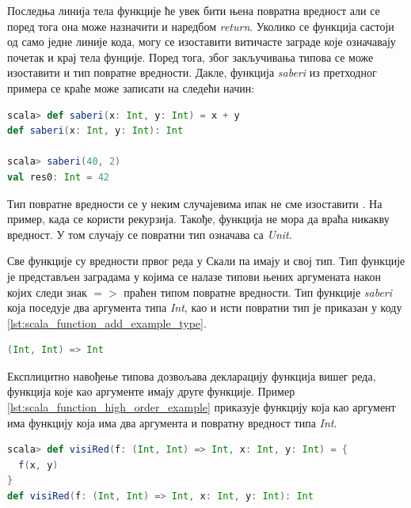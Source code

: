 \documentclass[12pt,oneside]{memoir}
\begin{document}
Последња линија тела функције ће увек бити њена повратна вредност али се поред тога она може назначити и наредбом \textit{return}. Уколико се функција састоји од само једне линије кода, могу се изоставити витичасте заграде које означавају почетак и крај тела фунције. Поред тога, због закључивања типова се може изоставити и тип повратне вредности. Дакле, функција \textit{saberi} из претходног примера се краће може записати на следећи начин:

\begin{lstlisting}[language=Scala, caption={Краћи запис функције \textit{saberi}}, label={lst:scala_function_add_example_simplified}, basicstyle=\small]
scala> def saberi(x: Int, y: Int) = x + y
def saberi(x: Int, y: Int): Int

scala> saberi(40, 2)
val res0: Int = 42
\end{lstlisting}

Тип повратне вредности се у неким случајевима ипак не сме изоставити \cite{scala_prog}. На пример, када се користи рекурзија. Такође, функција не мора да враћа никакву вредност. У том случају се повратни тип означава са \textit{Unit}.

Све функције су вредности првог реда у Скали па имају и свој тип. Тип функције је представљен заградама у којима се налазе типови њених аргумената након којих следи знак $=>$ праћен типом повратне вредности. Тип функције \textit{saberi} која поседује два аргумента типа \textit{Int}, као и исти повратни тип је приказан у коду \ref{lst:scala_function_add_example_type}.

\begin{lstlisting}[language=Scala, caption={Тип функције \textit{saberi}}, label={lst:scala_function_add_example_type}, basicstyle=\small]
(Int, Int) => Int
\end{lstlisting}

Експлицитно навођење типова дозвољава декларацију функција вишег реда, функција које као аргументе имају друге функције. Пример \ref{lst:scala_function_high_order_example} приказује функцију која као аргумент има функцију која има два аргумента и повратну вредност типа \textit{Int}.

\begin{lstlisting}[language=Scala, caption={Функција вишег реда}, label={lst:scala_function_high_order_example}, basicstyle=\small]
scala> def visiRed(f: (Int, Int) => Int, x: Int, y: Int) = {
  f(x, y)
}
def visiRed(f: (Int, Int) => Int, x: Int, y: Int): Int
\end{lstlisting}
\end{document}
